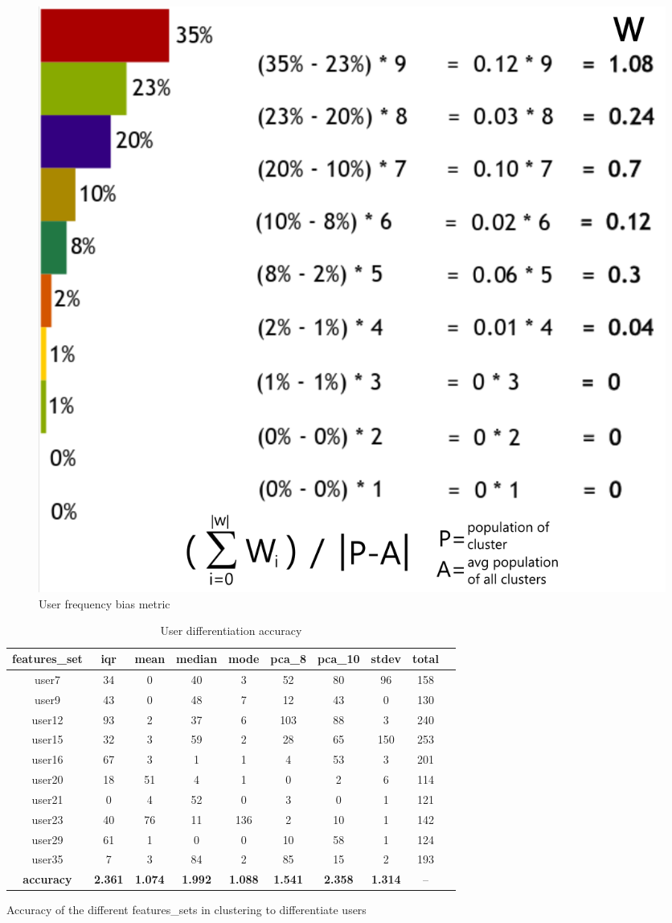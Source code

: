 \begin{figure}[h!]
	\includegraphics[width=.8\columnwidth]{figures/user_freq_distribution}

	\caption{User frequency bias metric}
	\label{fig:user_freq_bias_metric}
\end{figure}

\begin{table}[h!]
	\centering
	\begin{tabular}{ |c|c|c|c|c|c|c|c|c|c| }
		\hline
		\textbf{features{\_}set} & \textbf{iqr} & \textbf{mean} & \textbf{median} & \textbf{mode} & \textbf{pca{\_}8} & \textbf{pca{\_}10} & \textbf{stdev} & total \\
		\hline
		user7 & 34 & 0 & 40 & 3 & 52 & 80 & 96 & 158 \\
		user9 & 43 & 0 & 48 & 7 & 12 & 43 & 0 & 130 \\
		user12 & 93 & 2 & 37 & 6 & 103 & 88 & 3 & 240 \\
		user15 & 32 & 3 & 59 & 2 & 28 & 65 & 150 & 253\\
		user16 & 67 & 3 & 1 & 1 & 4 & 53 & 3 & 201\\
		user20 & 18 & 51 & 4 & 1 & 0 & 2 & 6 & 114 \\
		user21 & 0 & 4 & 52 & 0 & 3 & 0 & 1 & 121 \\
		user23 & 40 & 76 & 11 & 136 & 2 & 10 & 1 & 142 \\
		user29 & 61 & 1 & 0 & 0 & 10 & 58 & 1 & 124 \\
		user35 & 7 & 3 & 84 & 2 & 85 & 15 & 2 & 193 \\
		\hline
		\textbf{accuracy} & \textbf{2.361} & \textbf{1.074} & \textbf{1.992} & \textbf{1.088} & \textbf{1.541} & \textbf{2.358} & \textbf{1.314} & -- \\
		\hline
	\end{tabular}
	\caption{User differentiation accuracy}
	\label{tab:user-differentiation-accuracy}
	{\small Accuracy of the different features{\_}sets in clustering to differentiate users}
\end{table}

